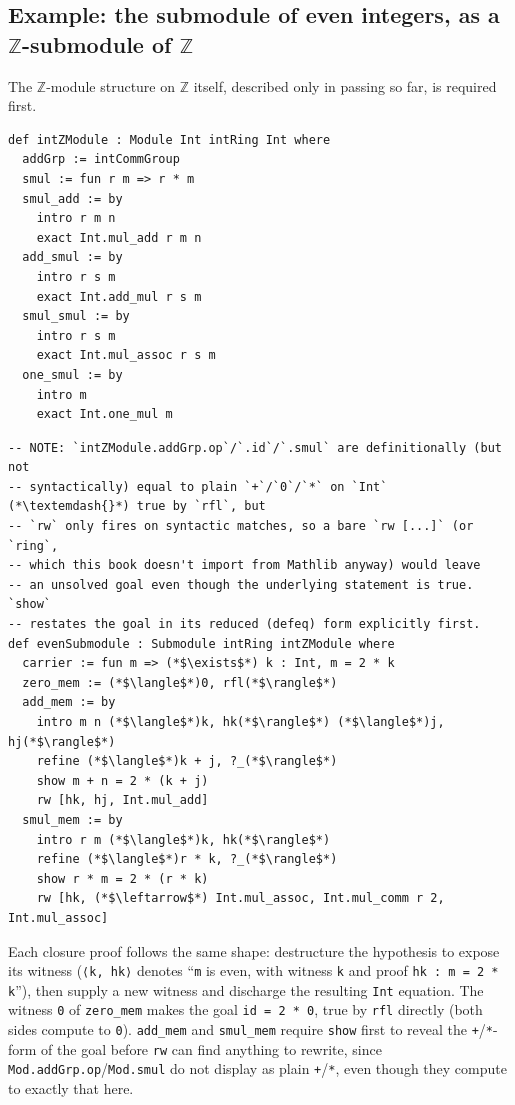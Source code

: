 \subsection{\texorpdfstring{Example: the submodule of even integers, as a \(\mathbb{Z}\)-submodule of \(\mathbb{Z}\)}{Example: the submodule of even integers, as a \textbackslash mathbb\{Z\}-submodule of \textbackslash mathbb\{Z\}}}\label{sec:10-modules:04-submodules:2}

The \(\mathbb{Z}\)-module structure on \(\mathbb{Z}\) itself, described only in passing so far, is required first.

\begin{lstlisting}
def intZModule : Module Int intRing Int where
  addGrp := intCommGroup
  smul := fun r m => r * m
  smul_add := by
    intro r m n
    exact Int.mul_add r m n
  add_smul := by
    intro r s m
    exact Int.add_mul r s m
  smul_smul := by
    intro r s m
    exact Int.mul_assoc r s m
  one_smul := by
    intro m
    exact Int.one_mul m
\end{lstlisting}

\begin{lstlisting}
-- NOTE: `intZModule.addGrp.op`/`.id`/`.smul` are definitionally (but not
-- syntactically) equal to plain `+`/`0`/`*` on `Int` (*\textemdash{}*) true by `rfl`, but
-- `rw` only fires on syntactic matches, so a bare `rw [...]` (or `ring`,
-- which this book doesn't import from Mathlib anyway) would leave
-- an unsolved goal even though the underlying statement is true. `show`
-- restates the goal in its reduced (defeq) form explicitly first.
def evenSubmodule : Submodule intRing intZModule where
  carrier := fun m => (*$\exists$*) k : Int, m = 2 * k
  zero_mem := (*$\langle$*)0, rfl(*$\rangle$*)
  add_mem := by
    intro m n (*$\langle$*)k, hk(*$\rangle$*) (*$\langle$*)j, hj(*$\rangle$*)
    refine (*$\langle$*)k + j, ?_(*$\rangle$*)
    show m + n = 2 * (k + j)
    rw [hk, hj, Int.mul_add]
  smul_mem := by
    intro r m (*$\langle$*)k, hk(*$\rangle$*)
    refine (*$\langle$*)r * k, ?_(*$\rangle$*)
    show r * m = 2 * (r * k)
    rw [hk, (*$\leftarrow$*) Int.mul_assoc, Int.mul_comm r 2, Int.mul_assoc]
\end{lstlisting}

Each closure proof follows the same shape: destructure the hypothesis to expose its witness (\texttt{⟨k, hk⟩} denotes ``\texttt{m} is even, with witness \texttt{k} and proof \texttt{hk : m = 2 * k}''), then supply a new witness and discharge the resulting \texttt{Int} equation. The witness \texttt{0} of \texttt{zero\_\allowbreak{}mem} makes the goal \texttt{id = 2 * 0}, true by \texttt{rfl} directly (both sides compute to \texttt{0}). \texttt{add\_\allowbreak{}mem} and \texttt{smul\_\allowbreak{}mem} require \texttt{show} first to reveal the \texttt{+}/\texttt{*}-form of the goal before \texttt{rw} can find anything to rewrite, since \texttt{Mod.addGrp.op}/\texttt{Mod.smul} do not display as plain \texttt{+}/\texttt{*}, even though they compute to exactly that here.

